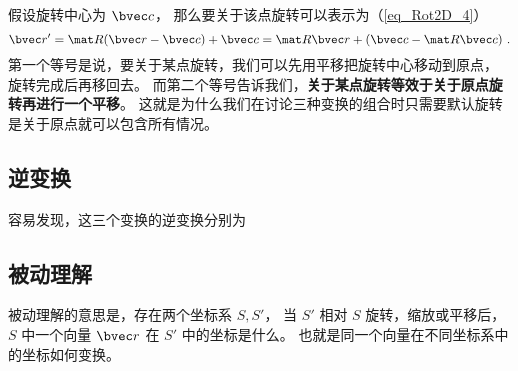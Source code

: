 假设旋转中心为 $\bvec c$， 那么要关于该点旋转可以表示为（\autoref{eq_Rot2D_4}）
\begin{equation}
\bvec r' = \mat R(\bvec r-\bvec c) + \bvec c = \mat R\bvec r + (\bvec c-\mat R\bvec c)~.
\end{equation}
第一个等号是说，要关于某点旋转，我们可以先用平移把旋转中心移动到原点， 旋转完成后再移回去。 而第二个等号告诉我们，\textbf{关于某点旋转等效于关于原点旋转再进行一个平移}。 这就是为什么我们在讨论三种变换的组合时只需要默认旋转是关于原点就可以包含所有情况。

\subsection{逆变换}
容易发现，这三个变换的逆变换分别为 

\subsection{被动理解}
被动理解的意思是，存在两个坐标系 $S,S'$， 当 $S'$ 相对 $S$ 旋转，缩放或平移后， $S$ 中一个向量 $\bvec r$ 在 $S'$ 中的坐标是什么。 也就是同一个向量在不同坐标系中的坐标如何变换。

